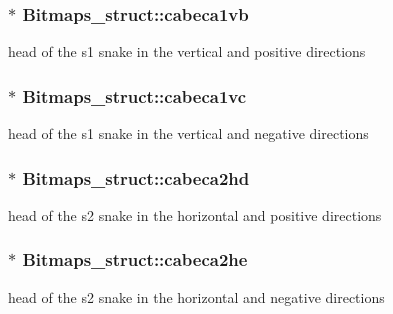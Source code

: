\subsubsection[{\texorpdfstring{cabeca1vb}{cabeca1vb}}]{$\ast$ Bitmaps\+\_\+struct\+::cabeca1vb}\hypertarget{group__graphics_ga5737d3b582663eb60cd3fd47421707b3}{}\label{group__graphics_ga5737d3b582663eb60cd3fd47421707b3}


head of the s1 snake in the vertical and positive directions 

\subsubsection[{\texorpdfstring{cabeca1vc}{cabeca1vc}}]{$\ast$ Bitmaps\+\_\+struct\+::cabeca1vc}\hypertarget{group__graphics_ga257cc4fca4ad7cceb125e4e43f62a17b}{}\label{group__graphics_ga257cc4fca4ad7cceb125e4e43f62a17b}


head of the s1 snake in the vertical and negative directions 

\subsubsection[{\texorpdfstring{cabeca2hd}{cabeca2hd}}]{$\ast$ Bitmaps\+\_\+struct\+::cabeca2hd}\hypertarget{group__graphics_ga74f59c6b2020b67b1e4c40b4d07b7dcb}{}\label{group__graphics_ga74f59c6b2020b67b1e4c40b4d07b7dcb}


head of the s2 snake in the horizontal and positive directions 

\subsubsection[{\texorpdfstring{cabeca2he}{cabeca2he}}]{$\ast$ Bitmaps\+\_\+struct\+::cabeca2he}\hypertarget{group__graphics_gad921a321d31f1c5f8430770b09949bd8}{}\label{group__graphics_gad921a321d31f1c5f8430770b09949bd8}


head of the s2 snake in the horizontal and negative directions 

